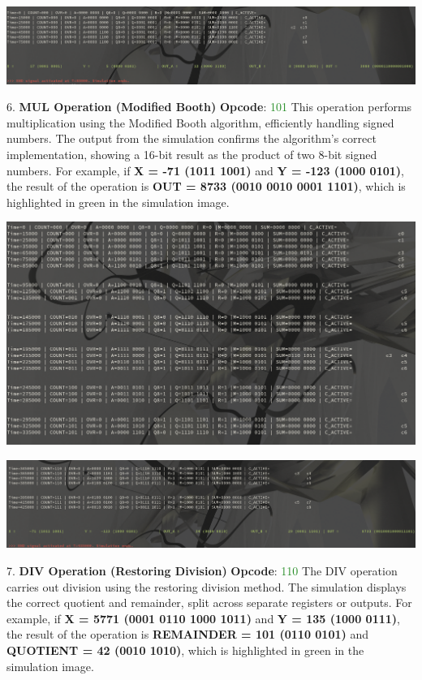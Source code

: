 \documentclass[12pt, letterpaper]{article}
\begin{document}
\begin{center}
\includegraphics[scale=0.3]{Documentation/SUB}
\end{center}


6.     \textbf{MUL Operation (Modified Booth)}
    \textbf{Opcode}: \textcolor{ForestGreen}{101}
    This operation performs multiplication using the Modified Booth algorithm, efficiently handling signed numbers. The output from the simulation confirms the algorithm's correct implementation, showing a 16-bit result as the product of two 8-bit signed numbers.
    For example, if \textbf{X = -71 (1011 1001)} and \textbf{Y = -123 (1000 0101)}, the result of the operation is \textbf{OUT = 8733 (0010 0010 0001 1101)}, which is highlighted in green in the simulation image.

\begin{center}
\includegraphics[scale=0.3]{Documentation/MUL1}
\end{center}

\begin{center}
\includegraphics[scale=0.3]{Documentation/MUL2}
\end{center}

7. \textbf{DIV Operation (Restoring Division)}
\textbf{Opcode}: \textcolor{ForestGreen}{110}
The DIV operation carries out division using the restoring division method. The simulation displays the correct quotient and remainder, split across separate registers or outputs.
For example, if \textbf{X = 5771 (0001 0110 1000 1011)} and \textbf{Y = 135 (1000 0111)}, the result of the operation is \textbf{REMAINDER = 101 (0110 0101)} and \textbf{QUOTIENT = 42 (0010 1010)}, which is highlighted in green in the simulation image.
\end{document}
